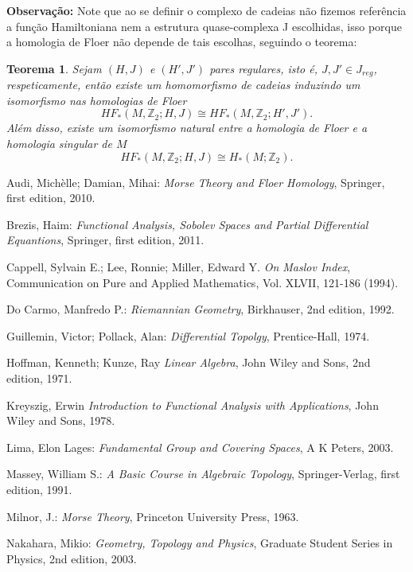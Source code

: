 \documentclass[12pt]{book}
\newtheorem{teorema}{Teorema}[section]
\newcommand{\inteiros}{\mathbb{Z}}
\begin{document}
	\textbf{Observação:} Note que ao se definir o complexo de cadeias não fizemos referência a função Hamiltoniana nem a estrutura quase-complexa J escolhidas, isso porque a homologia de Floer não depende de tais escolhas, seguindo o teorema:
	
	\begin{teorema}
		Sejam $(H,J)$ e $(H',J')$ pares regulares, isto é, $J, J' \in J_{reg}$, respeticamente, então existe um homomorfismo de cadeias induzindo um isomorfismo nas homologias de Floer
		$$
		HF_{*}(M,\inteiros_{2};H,J) \cong HF_{*}(M,\inteiros_{2};H',J'). 
		$$
		Além disso, existe um isomorfismo natural entre a homologia de Floer e a homologia singular de $M$
		$$
		HF_{*}(M,\inteiros_{2};H,J) \cong H_{*}(M;\inteiros_{2}). 
		$$
		
	\end{teorema}
	
	\begin{thebibliography}{9}
		Audi, Michèlle; Damian, Mihai:
		\emph{Morse Theory and Floer Homology},
		Springer, first edition,
		2010.
		
		Brezis, Haim:
		\emph{Functional Analysis, Sobolev Spaces and Partial Differential Equantions},
		Springer, first edition,
		2011.
		
		Cappell, Sylvain E.; Lee, Ronnie; Miller, Edward Y.
		\emph{On Maslov Index}, Communication on Pure and Applied Mathematics, Vol. XLVII, 121-186 (1994).
		
		Do Carmo, Manfredo P.:
		\emph{Riemannian Geometry},
		Birkhauser, 2nd edition,
		1992.
		
		Guillemin, Victor; Pollack, Alan:
		\emph{Differential Topolgy},
		Prentice-Hall,
		1974.	
	
		Hoffman, Kenneth; Kunze, Ray
		\emph{Linear Algebra},
		John Wiley and Sons, 2nd edition, 1971.
		
		Kreyszig, Erwin
		\emph{Introduction to Functional Analysis with Applications},
		John Wiley and Sons, 1978.

		Lima, Elon Lages:
		\emph{Fundamental Group and Covering Spaces},
		A K Peters, 2003.
	
		Massey, William S.:
		\emph{A Basic Course in Algebraic Topology},
		Springer-Verlag, first edition,
		1991.
		
		Milnor, J.:
		\emph{Morse Theory},
		Princeton University Press, 1963.
		
		Nakahara, Mikio:
		\emph{Geometry, Topology and Physics},
		Graduate Student Series in Physics, 2nd edition,
		2003.	
	\end{thebibliography}
	
\end{document}
